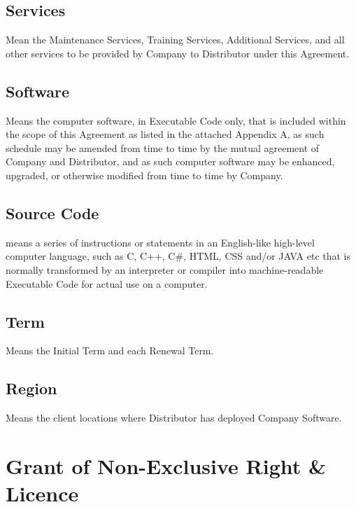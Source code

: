 \documentclass[letterpaper,10pt,openany,oneside,english]{sphinxmanual}
\begin{document}
\subsection{Services}
\label{\detokenize{definitions:services}}
Mean the Maintenance Services, Training Services, Additional Services, and all other services to be provided by Company to Distributor under this Agreement.


\subsection{Software}
\label{\detokenize{definitions:software}}
Means the computer software, in Executable Code only, that is included within the scope of this Agreement as listed in the attached Appendix A, as such schedule may be amended from time to time by the mutual agreement of Company and Distributor, and as such computer software may be enhanced, upgraded, or otherwise modified from time to time by Company.


\subsection{Source Code}
\label{\detokenize{definitions:source-code}}
means a series of instructions or statements in an English-like high-level computer language, such as C, C++, C\#, HTML, CSS and/or JAVA etc that is normally transformed by an interpreter or compiler into machine-readable Executable Code for actual use on a computer.


\subsection{Term}
\label{\detokenize{definitions:term}}
Means the Initial Term and each Renewal Term.


\subsection{Region}
\label{\detokenize{definitions:region}}
Means the client locations where Distributor has deployed Company Software.


\section{Grant of Non-Exclusive Right \& Licence}
\label{\detokenize{grantlicence:grant-of-non-exclusive-right-licence}}\label{\detokenize{grantlicence::doc}}
\end{document}
